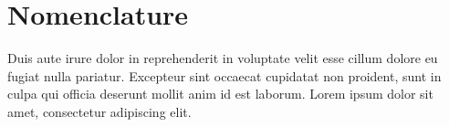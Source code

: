 %
%
\chapter*{Nomenclature}
\label{c:nomenclature}
%
%
\begin{spacing}{1.3}
%
Duis aute irure dolor in reprehenderit in voluptate velit esse cillum dolore eu fugiat nulla pariatur.
Excepteur sint occaecat cupidatat non proident, sunt in culpa qui officia deserunt mollit anim id est laborum.
Lorem ipsum dolor sit amet, consectetur adipiscing elit. 
%
\end{spacing}
%
\vspace*{-0.01cm}
%
\begin{spacing}{0.5}
%
%
\printacronyms[name={\normalsize Latin letters},sort=true, include-classes=latin]
%
%
\printacronyms[name={\normalsize Greek letters},sort=true, include-classes=greek]
%
%
\printacronyms[name={\normalsize Superscripts},sort=true, include-classes=superscript]
%
%
\printacronyms[name={\normalsize Subscripts},sort=true, include-classes=subscripts,]
%
%
%
\printacronyms[name={\normalsize Other},sort=true, include-classes=other,]
%
\end{spacing}
%
%
%
